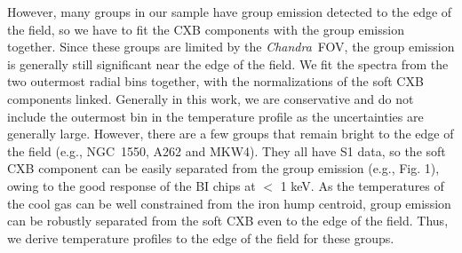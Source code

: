 \documentclass{aastex}
\def\chandra    {{\em Chandra}\/}
\begin{document}
However, many groups in our sample have group emission detected to the edge of the
field, so we have to fit the CXB components with the group emission together.
Since these groups are limited by the \chandra\ FOV, the group emission is generally
still significant near the edge of the field. We fit the spectra from the two outermost 
radial bins together, with the normalizations of the soft CXB components linked.
Generally in this work, we are conservative and do not
include the outermost bin in the temperature profile as the uncertainties are generally
large. However, there are a few groups that remain bright to the edge of the field (e.g.,
NGC~1550, A262 and MKW4). They all have S1 data, so the soft CXB component can be easily
separated from the group emission (e.g., Fig. 1), owing to the good response
of the BI chips at $<$ 1 keV. As the temperatures of the cool gas can be well
constrained from the iron hump centroid, group emission can be robustly separated from the
soft CXB even to the edge of the field.
Thus, we derive temperature profiles to the edge of the field for these groups.
\end{document}
